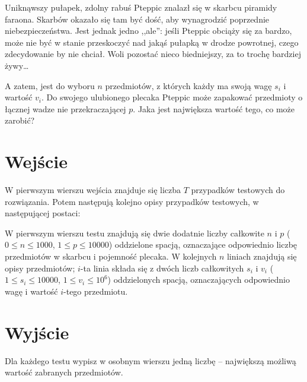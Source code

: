\documentclass{spiral-kurs}
\begin{document}
\makeheader
%
Uniknąwszy pułapek, zdolny rabuś Pteppic znalazł się w skarbcu piramidy faraona. Skarbów okazało się tam być dość, aby wynagrodzić poprzednie niebezpieczeństwa. Jest jednak jedno ,,ale'': jeśli Pteppic obciąży się za bardzo, może nie być w stanie przeskoczyć nad jakąś pułapką w drodze powrotnej, czego zdecydowanie by nie chciał. Woli pozostać nieco biedniejszy, za to trochę bardziej żywy\ldots

A zatem, jest do wyboru $n$ przedmiotów, z których każdy ma swoją wagę $s_i$ i wartość $v_i$. Do swojego ulubionego plecaka Pteppic może zapakować przedmioty o łącznej wadze nie przekraczającej $p$. Jaka jest największa wartość tego, co może zarobić?
  
  \section{Wejście}

W pierwszym wierszu wejścia znajduje się liczba $T$ przypadków testowych do rozwiązania. Potem następują kolejno opisy przypadków testowych, w następującej postaci:

W pierwszym wierszu testu znajdują się dwie dodatnie liczby całkowite $n$ i $p$ ($0\leq n \leq 1000$, $1 \leq p \leq 10000$) oddzielone spacją, oznaczające odpowiednio liczbę przedmiotów w skarbcu i pojemność plecaka. W kolejnych $n$ liniach znajdują się opisy przedmiotów; $i$-ta linia składa się z dwóch liczb całkowitych $s_i$ i $v_i$ ($1 \leq s_i \leq 10000$, $1 \leq v_i \leq 10^6$) oddzielonych spacją, oznaczających odpowiednio wagę i wartość $i$-tego przedmiotu.

  
  \section{Wyjście}


Dla każdego testu wypisz w osobnym wierszu jedną liczbę -- największą możliwą wartość zabranych przedmiotów.
                                  


  
\end{document}
